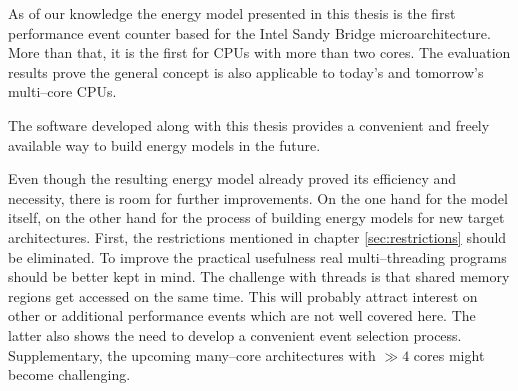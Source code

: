 
As of our knowledge the energy model presented in this thesis is the first
performance event counter based for the Intel\TReg{} Sandy Bridge
microarchitecture. More than that, it is the first for CPUs with more than two
cores. The evaluation results prove the general concept is also applicable to
today's and tomorrow's multi--core CPUs.

The software developed along with this thesis provides a convenient and freely
available way to build energy models in the future.


\label{sec:problems}

Even though the resulting energy model already proved its efficiency and
necessity, there is room for further improvements. On the one hand for the model
itself, on the other hand for the process of building energy models for new
target architectures. First, the restrictions mentioned in chapter
\ref{sec:restrictions} should be eliminated. To improve the practical usefulness
real multi--threading programs should be better kept in mind. The challenge with
threads is that shared memory regions get accessed on the same time. This will
probably attract interest on other or additional performance events which are
not well covered here. The latter also shows the need to develop a convenient
event selection process. Supplementary, the upcoming many--core architectures
with $\gg 4$ cores might become challenging.

